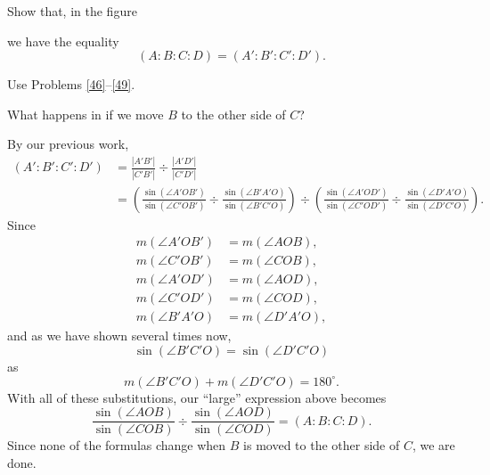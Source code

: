 \documentclass{ximera}
\begin{document}
\begin{problem}\label{50}
Show that, in the figure%
\begin{image}
\end{image}
we have the equality%
\[
\left(  A:B:C:D\right)  =\left(A':B':C':D'\right)  .
\]


\begin{hint}
Use Problems \ref{46}--\ref{49}.
\end{hint}

What happens in if we move $B$ to the other side of $C$?
\begin{freeResponse}
By our previous work, 
\begin{align*}
(A':B':C':D') &=\frac{|A'B'|}{|C'B'|}\div \frac{|A'D'|}{|C'D'|}\\
&=\left(\frac{\sin(\angle A'OB')}{\sin(\angle C'OB')} \div \frac{\sin(\angle B'A'O)}{\sin(\angle B'C'O)}\right) \div \left(\frac{\sin(\angle A'OD')}{\sin(\angle C'OD')}\div\frac{\sin(\angle D'A'O)}{\sin(\angle D'C'O)}\right).
\end{align*}
Since 
\begin{align*}
m(\angle A'OB') &= m(\angle AOB),\\
m(\angle C'OB') &= m(\angle COB),\\
m(\angle A'OD') &= m(\angle AOD),\\
m(\angle C'OD') &= m(\angle COD),\\
m(\angle B'A'O) &= m(\angle D'A'O),
\end{align*}
and as we have shown several times now, 
\[
\sin(\angle B'C'O) = \sin(\angle D'C'O)
\]
as 
\[
m(\angle B'C'O) + m(\angle D'C'O) = 180^\circ.
\]
With all of these substitutions, our ``large'' expression above becomes
\[
\frac{\sin(\angle AOB)}{\sin(\angle COB)} \div \frac{\sin(\angle AOD)}{\sin(\angle COD)} = (A:B:C:D). 
\]
Since none of the formulas change when $B$ is moved to the other side
of $C$, we are done.  
\end{freeResponse}
\end{problem}
\end{document}

